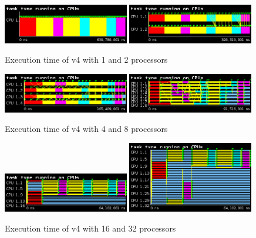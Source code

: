\begin{figure}[H]%
    \label{fig:plot_v4_01}
    \centering
    \includegraphics[width=0.49\textwidth]{./data/3dfft_/plots/v4_01.png}
    \includegraphics[width=0.49\textwidth]{./data/3dfft_/plots/v4_02.png}
    \caption{Execution time of v4 with 1 and 2 processors}%
\end{figure}

\begin{figure}[H]%
    \label{fig:plot_v4_04}
    \centering
    \includegraphics[width=0.49\textwidth]{./data/3dfft_/plots/v4_04.png}
    \includegraphics[width=0.49\textwidth]{./data/3dfft_/plots/v4_08.png}
    \caption{Execution time of v4 with 4 and 8 processors}%
\end{figure}

\begin{figure}[H]%
    \label{fig:plot_v4_16}
    \centering
    \includegraphics[width=0.49\textwidth]{./data/3dfft_/plots/v4_16.png}
    \includegraphics[width=0.49\textwidth]{./data/3dfft_/plots/v4_32.png}
    \caption{Execution time of v4 with 16 and 32 processors}%
\end{figure}


